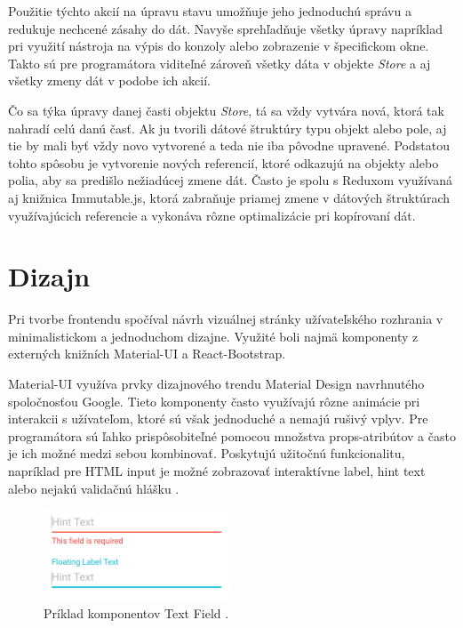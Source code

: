 \documentclass[
  digital, %
  table,   %
  lof,     %
  lot,     %
]{fithesis3}
\begin{document}
Použitie týchto akcií na úpravu stavu umožňuje jeho jednoduchú správu a redukuje nechcené zásahy do dát. Navyše sprehľadňuje všetky úpravy napríklad pri využití nástroja na výpis do konzoly alebo zobrazenie v špecifickom okne. Takto sú pre programátora viditeľné zároveň všetky dáta v objekte \textit{Store} a aj všetky zmeny dát v podobe ich akcií.

Čo sa týka úpravy danej časti objektu \textit{Store}, tá sa vždy vytvára nová, ktorá tak nahradí celú danú časť. Ak ju tvorili dátové štruktúry typu objekt alebo pole, aj tie by mali byť vždy novo vytvorené a teda nie iba pôvodne upravené. Podstatou tohto spôsobu je vytvorenie nových referencií, ktoré odkazujú na objekty alebo polia, aby sa predišlo nežiadúcej zmene dát. Často je spolu s Reduxom využívaná aj knižnica Immutable.js, ktorá zabraňuje priamej zmene v dátových štruktúrach využívajúcich referencie a vykonáva rôzne optimalizácie pri kopírovaní dát.

\section{Dizajn}
Pri tvorbe frontendu spočíval návrh vizuálnej stránky užívateľského rozhrania v minimalistickom a jednoduchom dizajne. Využité boli najmä komponenty z externých knižních Material-UI a React-Bootstrap.

Material-UI využíva prvky dizajnového trendu Material Design navrhnutého spoločnosťou Google. Tieto komponenty často využívajú rôzne animácie pri interakcii s užívateľom, ktoré sú však jednoduché a nemajú rušivý vplyv. Pre programátora sú ľahko prispôsobiteľné pomocou množstva props-atribútov a často je ich možné medzi sebou kombinovať. Poskytujú užitočnú funkcionalitu, napríklad pre HTML input je možné zobrazovať interaktívne label, hint text alebo nejakú validačnú hlášku \parencite{materialui}.

\begin{figure}
	\begin{center}
	\includegraphics[width=0.5\textwidth]{img/materialui.png}
	\end{center}
    \caption{Príklad komponentov Text Field \parencite{materialui}.}
	\label{fig:materialui}
\end{figure}
\end{document}
